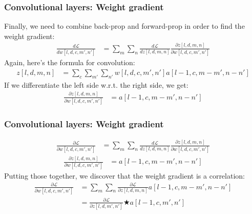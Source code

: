 \documentclass{beamer}
\begin{document}
\begin{frame}
  \frametitle{Convolutional layers: Weight gradient}

  Finally, we need to combine back-prop and forward-prop in order to
  find  the weight gradient:
  \begin{align*}
    \frac{d{\mathcal L}}{dw[l,d,c,m',n']} &=
    \sum_{m}\sum_n\frac{d{\mathcal L}}{dz[l,d,m,n]}
    \frac{\partial z[l,d,m,n]}{\partial w[l,d,c,m',n']}
  \end{align*}
  Again, here's the formula for convolution:
  \begin{align*}
    z[l,d,m,n] &= \sum_c\sum_{m'}\sum_{n'} w[l,d,c,m',n']a[l-1,c,m-m',n-n']
  \end{align*}
  If we differentiate the left side w.r.t. the right side, we get:
  \begin{align*}
    \frac{\partial z[l,d,m,n]}{\partial w[l,d,c,m',n']} &= a[l-1,c,m-m',n-n']
  \end{align*}
\end{frame}

\begin{frame}
  \frametitle{Convolutional layers: Weight gradient}

  \begin{align*}
    \frac{\partial{\mathcal L}}{\partial w[l,d,c,m',n']} &=
    \sum_{m}\sum_n\frac{d{\mathcal L}}{dz[l,d,m,n]}
    \frac{\partial z[l,d,m,n]}{\partial w[l,d,c,m',n']}
  \end{align*}
  \begin{align*}
    \frac{\partial z[l,d,m,n]}{\partial w[l,d,c,m',n']} &= a[l-1,c,m-m',n-n']
  \end{align*}
  Putting those together, we discover that the weight gradient is a correlation:
  \begin{align*}
    \frac{\partial{\mathcal L}}{\partial w[l,d,c,m',n']} &=
    \sum_{m}\sum_n \frac{\partial{\mathcal L}}{\partial z[l,d,m,n]}a[l-1,c,m-m',n-n']\\
    &= \frac{\partial{\mathcal L}}{\partial z[l,d,m',n']} \bigstar a[l-1,c,m',n']
  \end{align*}
\end{frame}
\end{document}
